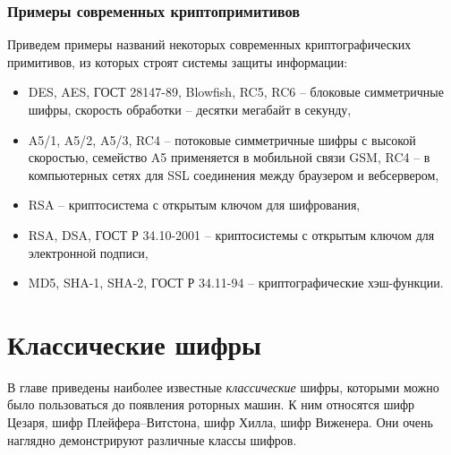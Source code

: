 \documentclass[10pt,a4paper]{book}
\begin{document}




\subsection{Примеры современных криптопримитивов}

Приведем примеры названий некоторых современных криптографических примитивов, из которых строят системы защиты информации:
\begin{itemize}
    \item DES, AES, ГОСТ 28147-89, Blowfish, RC5, RC6 -- блоковые симметричные шифры, скорость обработки -- десятки мегабайт в секунду,
    \item A5/1, A5/2, A5/3, RC4 -- потоковые симметричные шифры с высокой скоростью, семейство A5 применяется в мобильной связи GSM, RC4 -- в компьютерных сетях для SSL соединения между браузером и вебсервером,
    \item RSA -- криптосистема с открытым ключом для шифрования,
    \item RSA, DSA, ГОСТ Р 34.10-2001 -- криптосистемы с открытым ключом для электронной подписи,
    \item MD5, SHA-1, SHA-2, ГОСТ Р 34.11-94 -- криптографические хэш-функции.
\end{itemize}





\chapter{Классические шифры}

В главе приведены наиболее известные \emph{классические} шифры, которыми можно было пользоваться до появления роторных машин. К ним относятся шифр Цезаря, шифр Плейфера--Витстона, шифр Хилла, шифр Виженера. Они очень наглядно демонстрируют различные классы шифров.







%
\end{document}
